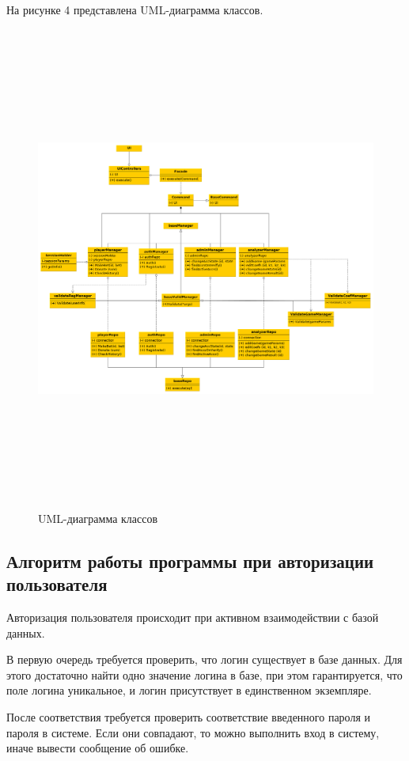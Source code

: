 На рисунке 4 представлена UML-диаграмма классов.
\FloatBarrier
\begin{figure}[h]	
	\begin{center}
		\includegraphics[angle=90, width=\linewidth, height=16cm]{inc/uml.png}
	\end{center}
	\captionsetup{justification=centering, labelsep=defffis}
	\caption{UML-диаграмма классов}
	\label{fig::uml}
\end{figure}
\FloatBarrier

\subsection{Алгоритм работы программы при авторизации пользователя}
Авторизация пользователя происходит при активном взаимодействии с базой данных.

В первую очередь требуется проверить, что логин существует в базе данных. 
Для этого достаточно найти одно значение логина в базе, при этом гарантируется, что поле логина уникальное, и логин присутствует в единственном экземпляре.

После соответствия требуется проверить соответствие введенного пароля и пароля в системе. 
Если они совпадают, то можно выполнить вход в систему, иначе вывести сообщение об ошибке.

